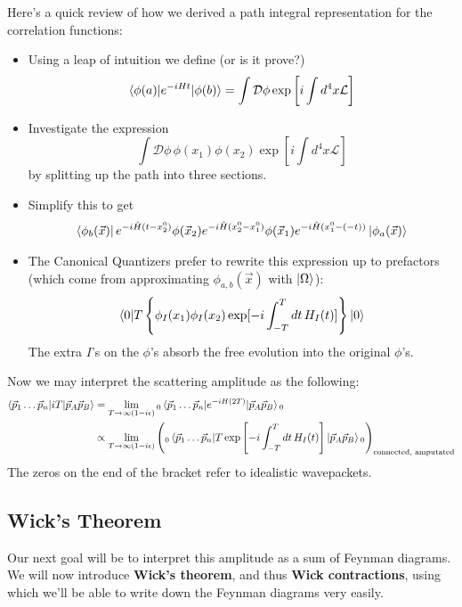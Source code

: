 \documentclass{report}
\theoremstyle{plain}
\theoremstyle{definition}
\theoremstyle{remark}
\newcommand{\mc}{\mathcal}
\begin{document}
Here's a quick review of how we derived a path integral representation for
the correlation functions:
\begin{itemize}
    \item Using a leap of intuition we define (or is it prove?)
        \[ \braket{\phi(a)|e^{-iHt}|\phi(b)} = \int \mc D\phi
            \exp \left[ i\int d^4x \mc L \right] \]
    \item Investigate the expression
        \[ \int \mc D\phi\, \phi(x_1)\phi(x_2) \exp \left[ i\int d^4x \mc
        L\right] \]
        by splitting up the path into three sections.
    \item Simplify this to get 
\begin{align} \bra{\phi_b(\vec{x})} e^{-i\hat{H}(t - x_2^0)} \phi(\vec{x}_2)
    e^{-i\hat{H}(x_2^0 - x_1^0)} \phi(\vec{x}_1) e^{-i\hat{H}(x_1^0 -
(-t))} \ket{\phi_a(\vec{x})}
\end{align}
    \item The Canonical Quantizers prefer to rewrite this expression up to
        prefactors (which come from approximating $\phi_{a,b}(\vec x)$ with
        $\ket\Omega$):
\[
\braket{0|T\left\{\phi_I(x_1)\phi_I(x_2)\exp[-i\int_{-T}^Tdt\,H_I(t)]\right\}|0}
\]
        The extra $I$'s on the $\phi$'s absorb the free evolution into the
        original $\phi$'s. 
\end{itemize}

Now we may interpret the scattering amplitude as the following:
\begin{align}\braket{\vec p_1\ldots\vec p_n|iT|\vec p_A\vec p_B}
&=\lim_{T\to\infty(1-i\epsilon)} {}_0\braket{\vec p_1\ldots\vec p_n
|e^{-iH(2T)}|\vec p_A\vec p_B} { }_0\\
&\propto\lim_{T\to\infty(1-i\epsilon)} \left( {}_0\braket{\vec p_1\ldots\vec p_n
|T\exp\left[ -i\int_{-T}^T dt\, H_I(t) \right]|
\vec p_A\vec p_B} { }_0 \right)_\text{connected, amputated}
\label{Smatrix}
\end{align}
The zeros on the end of the bracket refer to idealistic wavepackets. 


\subsection{Wick's Theorem}
Our next goal will be to interpret this amplitude as a sum of Feynman diagrams.
We will now introduce \textbf{Wick's theorem}, and thus \textbf{Wick
contractions}, using which we'll be able to write down the Feynman diagrams
very easily.
\end{document}
